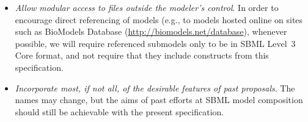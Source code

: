 \begin{itemize}
\item \emph{Allow modular access to files outside the modeler's
    control}.  In order to encourage direct referencing of models (e.g.,
  to models hosted online on sites such as BioModels Database
  (\url{http://biomodels.net/database}), whenever possible, we will
  require referenced submodels only to be in SBML Level~3 Core format,
  and not require that they include constructs from this specification.

\item \emph{Incorporate most, if not all, of the desirable features of
    past proposals}. The names may change, but the aims of past efforts
  at SBML model composition should still be achievable with the present
  specification.

\end{itemize}

